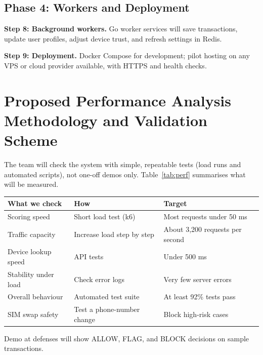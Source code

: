 \subsection{Phase 4: Workers and Deployment}
\textbf{Step 8: Background workers.} Go worker services will save transactions, update user
profiles, adjust device trust, and refresh settings in Redis.

\textbf{Step 9: Deployment.} Docker Compose for development; pilot hosting on any VPS or
cloud provider available, with HTTPS and health checks.



\section{Proposed Performance Analysis Methodology and Validation Scheme}
\label{sec:validation}

The team will check the system with simple, repeatable tests (load runs and automated scripts),
not one-off demos only. Table~\ref{tab:perf} summarises what will be measured.

\vspace{0.5em}
\begin{center}
  \small
  \begin{tabularx}{0.92\textwidth}{|>{\raggedright\arraybackslash}l|X|>{\raggedright\arraybackslash}l|}
    \hline
    \textbf{What we check} & \textbf{How} & \textbf{Target} \\
    \hline
    Scoring speed & Short load test (k6) & Most requests under 50 ms \\
    \hline
    Traffic capacity & Increase load step by step & About 3,200 requests per second \\
    \hline
    Device lookup speed & API tests & Under 500 ms \\
    \hline
    Stability under load & Check error logs & Very few server errors \\
    \hline
    Overall behaviour & Automated test suite & At least 92\% tests pass \\
    \hline
    SIM swap safety & Test a phone-number change & Block high-risk cases \\
    \hline
  \end{tabularx}
  \label{tab:perf}
\end{center}
\vspace{0.5em}

\noindent Demo at defenses will show ALLOW, FLAG, and BLOCK decisions on sample transactions.

